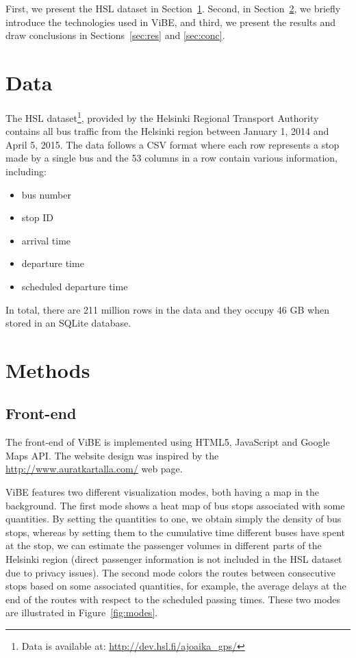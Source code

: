 \documentclass[a4paper,12pt]{article}
\begin{document}
First, we present the HSL dataset in Section~\ref{sec:data}. Second, in 
Section~\ref{sec:methods}, we briefly introduce the technologies used in ViBE, 
and third, we present the results and draw conclusions in 
Sections~\ref{sec:res} and \ref{sec:conc}.

\section{Data} \label{sec:data}

The HSL dataset\footnote{Data is available at: 
\url{http://dev.hsl.fi/ajoaika_gps/}}, provided by the Helsinki Regional 
Transport Authority contains all bus traffic from the Helsinki region between 
January 1, 2014 and April 5, 2015. The data follows a CSV format where each row 
represents a stop made by a single bus and the 53 columns in a row contain 
various information, including:
\begin{itemize}
\item bus number
\item stop ID
\item arrival time
\item departure time
\item scheduled departure time
\end{itemize}
In total, there are 211 million rows in the data and they occupy 46 GB 
when stored in an SQLite database.

\section{Methods} \label{sec:methods}

\subsection{Front-end}

The front-end of ViBE is implemented using HTML5, JavaScript and Google Maps 
API. The website design was inspired by the \url{http://www.auratkartalla.com/} 
web page.

ViBE features two different visualization modes, both having a map in the 
background. The first mode shows a heat map of bus stops associated with some 
quantities. By setting the quantities to one, we obtain simply the density of 
bus stops, whereas by setting them to the cumulative time different buses 
have spent at the stop, we can estimate the passenger volumes in 
different parts of the Helsinki region (direct passenger information is not 
included in the HSL dataset due to privacy issues). The second mode colors the 
routes between consecutive stops based on some associated quantities, for 
example, the average delays at the end of the routes with respect to the 
scheduled passing times. These two modes are illustrated in 
Figure~\ref{fig:modes}.
\end{document}
